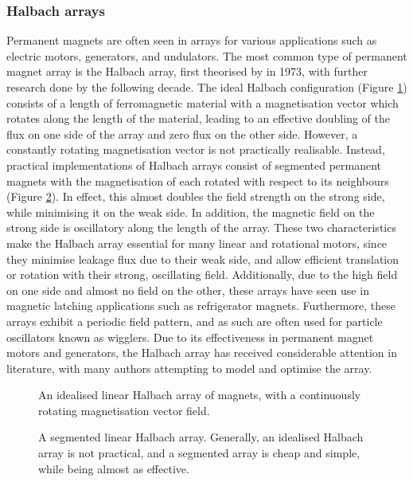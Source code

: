\subsubsection{Halbach arrays}
Permanent magnets are often seen in arrays for various applications such as electric motors, generators, and undulators. The most common type of permanent magnet array is the Halbach array, first theorised by \textcite{Mallinson1973} in 1973, with further research done by \textcite{Halbach1980} the following decade. The ideal Halbach configuration (Figure \ref{fig:idealHalbachArray}) consists of a length of ferromagnetic material with a magnetisation vector which rotates along the length of the material, leading to an effective doubling of the flux on one side of the array and zero flux on the other side. However, a constantly rotating magnetisation vector is not practically realisable. Instead, practical implementations of Halbach arrays consist of segmented permanent magnets with the magnetisation of each rotated with respect to its neighbours (Figure \ref{fig:segmentedHalbachArray}). In effect, this almost doubles the field strength on the strong side, while minimising it on the weak side. In addition, the magnetic field on the strong side is oscillatory along the length of the array. These two characteristics make the Halbach array essential for many linear and rotational motors, since they minimise leakage flux due to their weak side, and allow efficient translation or rotation with their strong, oscillating field. Additionally, due to the high field on one side and almost no field on the other, these arrays have seen use in magnetic latching applications such as refrigerator magnets. Furthermore, these arrays exhibit a periodic field pattern, and as such are often used for particle oscillators known as wigglers. Due to its effectiveness in permanent magnet motors and generators, the Halbach array has received considerable attention in literature, with many authors attempting to model and optimise the array.
\begin{figure}
    \centering
    
    \caption{An idealised linear Halbach array of magnets, with a continuously rotating magnetisation vector field.}
    \label{fig:idealHalbachArray}
\end{figure}
\begin{figure}
    \centering
    
    \caption{A segmented linear Halbach array. Generally, an idealised Halbach array is not practical, and a segmented array is cheap and simple, while being almost as effective.}
    \label{fig:segmentedHalbachArray}
\end{figure}

